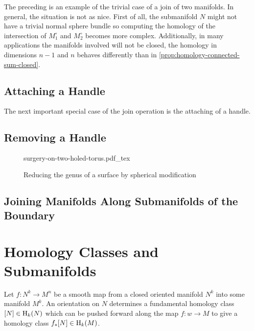 The preceding is an example of the trivial case of a join of two manifolds. In general, the situation is not as nice. First of all, the submanifold $N$ might not have a trivial normal sphere bundle so computing the homology of the intersection of $M_1^\circ$ and $M_2^\circ$ becomes more complex. Additionally, in many applications the manifolds involved will not be closed, the homology in dimensions $n-1$ and $n$ behaves differently than in \cref{prop:homology-connected-sum-closed}.

\subsection{Attaching a Handle}

The next important special case of the join operation is the attaching of a handle.

\begin{definition}

\end{definition}

\subsection{Removing a Handle}

\begin{figure}[ht]
	{surgery-on-two-holed-torus.pdf_tex}
	\caption{Reducing the genus of a surface by spherical modification}
\end{figure}

\subsection{Joining Manifolds Along Submanifolds of the Boundary}

\pagebreak
\section{Homology Classes and Submanifolds}\label{sec:representing-homology-classes}

Let $f : N^k\to M^n$ be a smooth map from a closed oriented manifold $N^k$ into some manifold $M^k$. An orientation on $N$ determines a fundamental homology class $[N]\in \operatorname{H}_k(N)$ which can be pushed forward along the map $f : w \to M$ to give a homology class $f_* [N]\in \operatorname{H}_k(M)$. 

